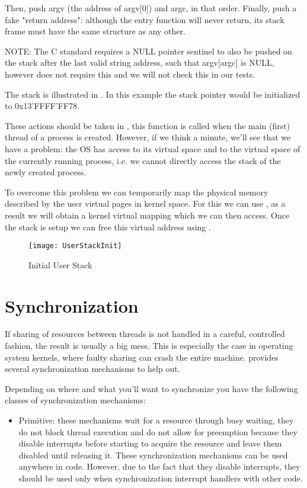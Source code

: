 \begin{appendices}
Then, push argv (the address of argv[0]) and argc, in that order. Finally, push a fake "return
address": although the entry function will never return, its stack frame must have the same
structure as any other.

NOTE: The C standard requires a NULL pointer sentinel to also be pushed on the stack after the last
valid string address, such that argv[argc] is NULL, however \projectname does not require this and
we will not check this in our tests.

The stack is illustrated in . In this example the stack pointer would be
initialized to 0x13'FFFF'FF78.

These actions should be taken in , this function is called
when the main (first) thread of a process is created. However, if we think a minute, we'll see that
we have a problem: the OS has access to its virtual space and to the virtual space of the currently
running process, i.e. we cannot directly access the stack of the newly created process.

To overcome this problem we can temporarily map the physical memory described by the user virtual
pages in kernel space. For this we can use , as a
result we will obtain a kernel virtual mapping which we can then access. Once the stack is setup
we can free this virtual address using .

\begin{figure}
	\centering
	\texttt{[image: UserStackInit]}
		\caption{Initial User Stack}
	\label{fig:UserStackInit}
\end{figure}

\section{Synchronization}
\label{sect:Synch}

If sharing of resources between threads is not handled in a careful, controlled fashion, the result
is usually a big mess. This is especially the case in operating system kernels, where faulty sharing
can crash the entire machine. \projectname provides several synchronization mechanisms to help out.

Depending on where and what you'll want to synchronize you have the following classes of
synchronization mechanisms:
\begin{itemize}
	\item Primitive: these mechanisms wait for a resource through busy waiting, they do not block
thread execution and do not allow for preemption because they disable interrupts before starting to
acquire the resource and leave them disabled until releasing it. These synchronization mechanisms
can be used anywhere in code. However, due to the fact that they disable interrupts, they should
be used only when synchronization interrupt handlers with other code.


\end{itemize}
\end{appendices}
